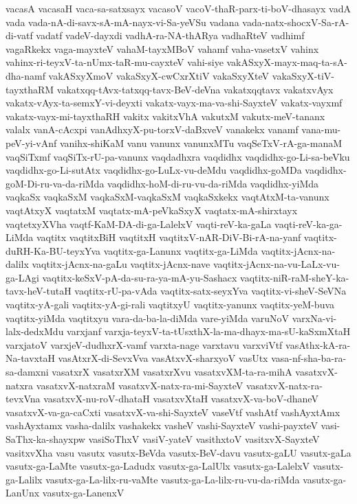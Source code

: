 {vacasA
vacasaH
vaca-sa-satxsayx
vacasoV
vacoV-thaR-parx-ti-boV-dhasayx
vadA
vada
vada-nA-di-savx-sA-mA-nayx-vi-Sa-yeVSu
vadana
vada-natx-shocxV-Sa-rA-di-vatf
vadatf
vadeV-dayxdi
vadhA-ra-NA-thARya
vadhaRteV
vadhimf
vagaRkekx
vaga-mayxteV
vahaM-tayxMBoV
vahamf
vaha-vasetxV
vahinx
vahinx-ri-teyxV-ta-nUmx-taR-mu-cayxteV
vahi-siye
vakASxyX-mayx-maq-ta-sA-dha-namf
vakASxyXmoV
vakaSxyX-cwCxrXtiV
vakaSxyXteV
vakaSxyX-tiV-tayxthaRM
vakatxqq-tAvx-tatxqq-tavx-BeV-deVna
vakatxqqtavx
vakatxvAyx
vakatx-vAyx-ta-semxY-vi-deyxti
vakatx-vayx-ma-va-shi-SayxteV
vakatx-vayxmf
vakatx-vayx-mi-tayxthaRH
vakitx
vakitxVhA
vakutxM
vakutx-meV-tananx
valalx
vanA-cAcxpi
vanAdhxyX-pu-torxV-daBxveV
vanakekx
vanamf
vana-mu-peV-yi-vAnf
vanihx-shiKaM
vanu
vanunx
vanunxMTu
vaqSeTxV-rA-ga-manaM
vaqSiTxmf
vaqSiTx-rU-pa-vanunx
vaqdadhxra
vaqdidhx
vaqdidhx-go-Li-sa-beVku
vaqdidhx-go-Li-sutAtx
vaqdidhx-go-LuLx-vu-deMdu
vaqdidhx-goMDa
vaqdidhx-goM-Di-ru-va-da-riMda
vaqdidhx-hoM-di-ru-vu-da-riMda
vaqdidhx-yiMda
vaqkaSx
vaqkaSxM
vaqkaSxM-vaqkaSxM
vaqkaSxkekx
vaqtAtxM-ta-vanunx
vaqtAtxyX
vaqtatxM
vaqtatx-mA-peVkaSxyX
vaqtatx-mA-shirxtayx
vaqtetxyXVha
vaqtf-KaM-DA-di-ga-LalelxV
vaqti-reV-ka-gaLa
vaqti-reV-ka-ga-LiMda
vaqtitx
vaqtitxBiH
vaqtitxH
vaqtitxV-nAR-DiV-Bi-rA-na-yanf
vaqtitx-duRH-Ka-BU-teyxYva
vaqtitx-ga-Lanunx
vaqtitx-ga-LiMda
vaqtitx-jAcnx-na-dalilx
vaqtitx-jAcnx-na-gaLu
vaqtitx-jAcnx-nave
vaqtitx-jAcnx-na-vu-LaLx-vu-ga-LAgi
vaqtitx-keSxV-pA-da-su-ra-ya-mA-yu-Sashacx
vaqtitx-niR-raM-sheY-ka-tavx-heV-tutaH
vaqtitx-rU-pa-vAda
vaqtitx-satx-seyxYva
vaqtitx-vi-sheV-SeVNa
vaqtitx-yA-gali
vaqtitx-yA-gi-rali
vaqtitxyU
vaqtitx-yanunx
vaqtitx-yeM-buva
vaqtitx-yiMda
vaqtitxyu
vara-da-ba-la-diMda
vare-yiMda
varuNoV
varxNa-vi-lalx-dedxMdu
varxjanf
varxja-teyxV-ta-tUsxthX-la-ma-dhayx-ma-sU-kaSxmXtaH
varxjatoV
varxjeV-dudhxrX-vamf
varxta-nage
varxtavu
varxviVtf
vasAthx-kA-ra-Na-tavxtaH
vasAtxrX-di-SevxVva
vasAtxvX-sharxyoV
vasUtx
vasa-nf-sha-ba-ra-sa-damxni
vasatxrX
vasatxrXM
vasatxrXvu
vasatxvXM-ta-ra-mihA
vasatxvX-natxra
vasatxvX-natxraM
vasatxvX-natx-ra-mi-SayxteV
vasatxvX-natx-ra-tevxVna
vasatxvX-nu-roV-dhataH
vasatxvXtaH
vasatxvX-va-boV-dhaneV
vasatxvX-va-ga-caCxti
vasatxvX-va-shi-SayxteV
vaseVtf
vashAtf
vashAyxtAmx
vashAyxtamx
vasha-dalilx
vashakekx
vasheV
vashi-SayxteV
vashi-payxteV
vasi-SaThx-ka-shayxpw
vasiSoThxV
vasiV-yateV
vasithxtoV
vasitxvX-SayxteV
vasitxvXha
vasu
vasutx
vasutx-BeVda
vasutx-BeV-davu
vasutx-gaLU
vasutx-gaLa
vasutx-ga-LaMte
vasutx-ga-Ladudx
vasutx-ga-LalUlx
vasutx-ga-LalelxV
vasutx-ga-Lalilx
vasutx-ga-La-lilx-ru-vaMte
vasutx-ga-La-lilx-ru-vu-da-riMda
vasutx-ga-LanUnx
vasutx-ga-LanenxV
}
